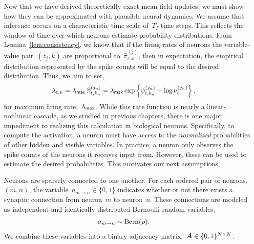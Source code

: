 
Now that we have derived theoretically exact mean field updates, we
must show how they can be approximated with plausible neural dynamics.
We assume that inference occurs on a characteristic time scale of~$T_I$
time steps. This reflects the window of time over which neurons estimate
probability distributions.
From Lemma~\ref{lem:consistency}, we know that if the firing rates of
neurons the variable-value pair~${(z_j,k)}$ are proportional
to~$\widehat{\pi}_{t,k}^{(j)}$, then in expectation, the empirical
distribution represented by the spike counts will be equal to the
desired distribution. Thus, we aim to set,
\begin{align*}
  \lambda_{t,n} &= \lambda_{\mathsf{max}} \, \widehat{\pi}_{t,k_n}^{(j_n)}
  = \lambda_{\mathsf{max}} \exp \left \{\psi_{t,k_n}^{(j_n)} -\log \nu_{t}^{(j_n)} \right \},
\end{align*}
for maximum firing rate,~$\lambda_{\mathsf{max}}$. While this rate function is
nearly a linear-nonlinear cascade, as we studied in previous
chapters, there is one major impediment to realizing this
calculation in biological neurons. Specifically, to compute
the activation, a neuron must have access to the \emph{normalized}
probabilities of other hidden and visible variables. In practice,
a neuron only observes the spike counts of the neurons it receives 
input from. However, these can be used to estimate the desired probabilities.
This motivates our next assumptions,

\begin{assumption}
  Neurons are sparsely connected to one another. For each ordered
  pair of neurons, $(m,n)$, the variable~$a_{m \to n} \in \{0,1\}$
  indicates whether or not there exists a synaptic connection from
  neuron~$m$ to neuron~$n$. These connections are modeled as
  independent and identically distributed Bernoulli random variables,
  \begin{align*}
    a_{m \to n} &\sim \mathrm{Bern}(\rho).
  \end{align*}
  We combine these variables into a binary adjacency 
  matrix,~$\boldsymbol{A} \in \{0,1\}^{N \times N}$.
\end{assumption}

